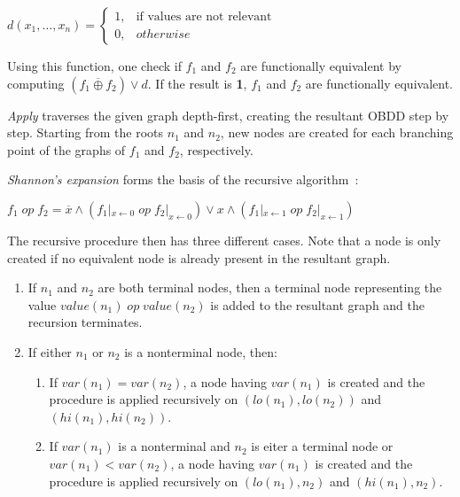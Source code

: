\documentclass{vldb}
\begin{document}
$d(x_1, \ldots, x_n)=
\begin{cases}
    1, & \text{if values are not relevant} \\
    0, & otherwise
\end{cases}
$

\noindent
Using this function, one check if $f_1$ and $f_2$ are functionally equivalent by
computing $(f_1\overline{\oplus}f_2)\lor d$. If the result is \textbf{1}, $f_1$
and $f_2$ are functionally equivalent.

\textit{Apply} traverses the given graph depth-first, creating the resultant OBDD
step by step. Starting from the roots $n_1$ and $n_2$, new nodes are created for
each branching point of the graphs of $f_1$ and $f_2$, respectively.

\textit{Shannon's expansion} forms the basis of the recursive
algorithm~\cite{BRYANT86}:
\begin{center}
$
f_1\;op\;f_2 =
\overline{x} \land \left(f_1|_{x\leftarrow 0}\;op\;f_2|_{x\leftarrow 0}\right)
\lor x \land \left(f_1|_{x\leftarrow 1}\;op\;f_2|_{x\leftarrow 1}\right)
$
\end{center}

\noindent
The recursive procedure then has three different cases. Note that a node is only
created if no equivalent node is already present in the resultant graph.
\begin{enumerate}
    \item{
        If $n_1$ and $n_2$ are both terminal nodes, then a terminal node
        representing the value $value(n_1)\;op\;value(n_2)$ is added to the
        resultant graph and the recursion terminates.
    }
    \item{
        If either $n_1$ or $n_2$ is a nonterminal node, then:
        \begin{enumerate}
            \item{
                If $var(n_1) = var(n_2)$, a node having $var(n_1)$ is created and
                the procedure is applied recursively on $(lo(n_1), lo(n_2))$ and
                $(hi(n_1), hi(n_2))$.
            }
            \item{
                If $var(n_1)$ is a nonterminal and $n_2$ is eiter a terminal node
                or $var(n_1) < var(n_2)$, a node having $var(n_1)$ is created and
                the procedure is applied recursively on $(lo(n_1), n_2)$ and
                $(hi(n_1), n_2)$.
            }
        \end{enumerate}
    }
\end{enumerate}
\end{document}
